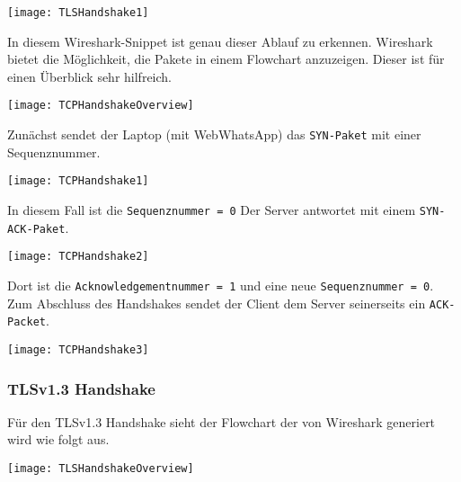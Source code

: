 \begin{center}
    \texttt{[image: TLSHandshake1]}
\end{center}
In diesem Wireshark-Snippet ist genau dieser Ablauf zu erkennen.
Wireshark bietet die Möglichkeit, die Pakete in einem Flowchart anzuzeigen. 
Dieser ist für einen Überblick sehr hilfreich.
\begin{center}
    \texttt{[image: TCPHandshakeOverview]} 
\end{center}

Zunächst sendet der Laptop (mit WebWhatsApp) das \texttt{SYN-Paket} mit einer Sequenznummer.

\begin{center}
    \texttt{[image: TCPHandshake1]}
\end{center}

In diesem Fall ist die \texttt{Sequenznummer = 0}
Der Server antwortet mit einem \texttt{SYN-ACK-Paket}.

\begin{center}
    \texttt{[image: TCPHandshake2]}
\end{center}

Dort ist die \texttt{Acknowledgementnummer = 1} und eine neue \texttt{Sequenznummer = 0}. 
Zum Abschluss des Handshakes sendet der Client dem Server seinerseits ein \texttt{ACK-Packet}.

\begin{center}
    \texttt{[image: TCPHandshake3]}
\end{center}

\subsubsection{TLSv1.3 Handshake}
Für den TLSv1.3 Handshake sieht der Flowchart der von Wireshark generiert
wird wie folgt aus.

\begin{center}
    \texttt{[image: TLSHandshakeOverview]}
\end{center}

